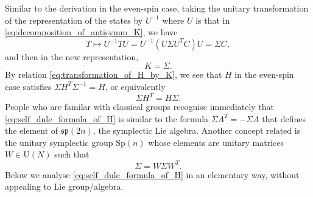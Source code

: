 \documentclass[11pt, a4paper]{article}
\numberwithin{equation}{section}
\newcommand{\Unitary}{\mathrm{U}}
\newcommand{\symplectic}{\mathfrak{sp}}
\newcommand{\Symplectic}{\mathrm{Sp}}
\theoremstyle{definition}
\theoremstyle{remark}
\begin{document}
Similar to the derivation in the even-spin case, taking the unitary transformation of the representation of the states by $U^{-1}$ where $U$ is that in \eqref{eq:decomposition_of_antisymm_K}, we have
\begin{equation}
  T \mapsto U^{-1} T U = U^{-1} (U \Sigma U^T C) U = \Sigma C,
\end{equation}
and then in the new representation,
\begin{equation}
  K = \Sigma.
\end{equation}
By relation \eqref{eq:transformation_of_H_by_K}, we see that $H$ in the even-spin case satisfies $\Sigma H^T \Sigma^{-1} = H$, or equivalently
\begin{equation} \label{eq:self_dule_formula_of_H}
  \Sigma H^T = H \Sigma.
\end{equation}
People who are familar with classical groups recognise immediately that \eqref{eq:self_dule_formula_of_H} is similar to the formula $\Sigma A^T = -\Sigma A$  that defines the element of $\symplectic(2n)$, the symplectic Lie algebra. Another concept related is the unitary symplectic group $\Symplectic(n)$ whose elements are unitary matrices $W \in \Unitary(N)$ such that
\begin{equation}
  \Sigma = W \Sigma W^T.
\end{equation}
Below we analyse \eqref{eq:self_dule_formula_of_H} in an elementary way, without appealing to Lie group/algebra.
\end{document}
